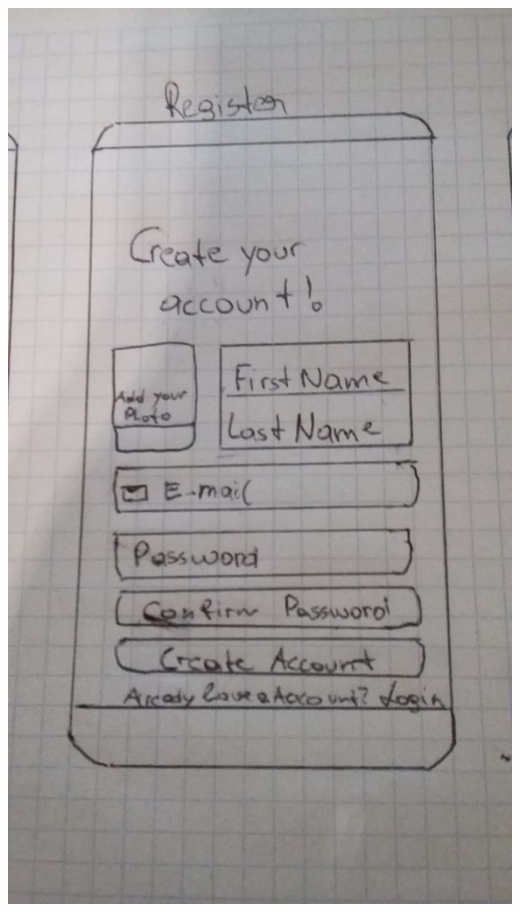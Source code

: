 \documentclass[12pt]{article}
\theoremstyle{definition}
\begin{document}
\includegraphics[scale=.2]{register.jpeg} 

\pagebreak
\end{document}
